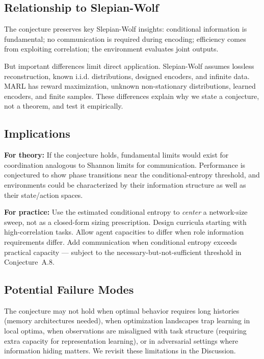 \documentclass[10pt, letterpaper]{article}
\begin{document}
\subsection{Relationship to Slepian-Wolf}

The conjecture preserves key Slepian-Wolf insights: conditional information is fundamental; no communication is required during encoding; efficiency comes from exploiting correlation; the environment evaluates joint outputs.

But important differences limit direct application. Slepian-Wolf assumes lossless reconstruction, known i.i.d. distributions, designed encoders, and infinite data. MARL has reward maximization, unknown non-stationary distributions, learned encoders, and finite samples. These differences explain why we state a conjecture, not a theorem, and test it empirically.

\subsection{Implications}

\textbf{For theory:} If the conjecture holds, fundamental limits would exist for coordination analogous to Shannon limits for communication. Performance is conjectured to show phase transitions near the conditional-entropy threshold, and environments could be characterized by their information structure as well as their state/action spaces.

\textbf{For practice:} Use the estimated conditional entropy to \emph{center} a network-size sweep, not as a closed-form sizing prescription. Design curricula starting with high-correlation tasks. Allow agent capacities to differ when role information requirements differ. Add communication when conditional entropy exceeds practical capacity --- subject to the necessary-but-not-sufficient threshold in Conjecture~A.8.

\subsection{Potential Failure Modes}

The conjecture may not hold when optimal behavior requires long histories (memory architectures needed), when optimization landscapes trap learning in local optima, when observations are misaligned with task structure (requiring extra capacity for representation learning), or in adversarial settings where information hiding matters. We revisit these limitations in the Discussion.
\end{document}
